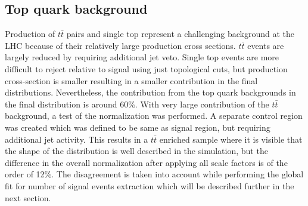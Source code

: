 \subsection{Top quark background}

Production of $t\bar{t}$ pairs and single top represent a challenging background at the LHC because of their relatively large production cross sections. $t\bar{t}$ events are largely reduced by requiring additional jet veto. Single top events are more difficult to reject relative to signal using just topological cuts, but production cross-section is smaller resulting in a smaller contribution in the final distributions. Nevertheless, the contribution from the top quark backgrounds in the final distribution is around 60$\%$.
With very large contribution of the $t\bar{t}$ background, a test of the normalization was performed. A separate control region was created which was defined to be same as signal region, but requiring additional jet activity. This results in a $t\bar{t}$ enriched sample where it is visible that the shape of the distribution is well described in the simulation, but the difference in the overall normalization after applying all scale factors is of the order of 12$\%$. The disagreement is taken into account while performing the global fit for number of signal events extraction which will be described further in the next section. 
